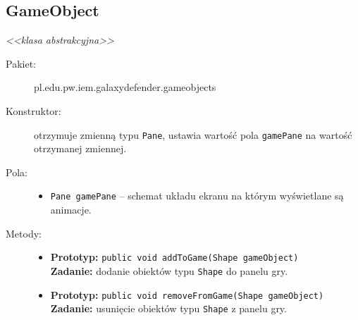 \documentclass[a4paper]{article}
\newcommand{\prog}{\texttt}
\begin{document}
\subsection{GameObject}
\textit{<<klasa abstrakcyjna>>}
\begin{description}
    \item[Pakiet:] pl.edu.pw.iem.galaxydefender.gameobjects
    \item[Konstruktor:] otrzymuje zmienną typu \prog{Pane}, ustawia wartość pola \prog{gamePane} na wartość otrzymanej zmiennej.
    \item[Pola:] \hfill
    \begin{itemize}
        \item \prog{Pane gamePane} -- schemat układu ekranu na którym wyświetlane są animacje.
    \end{itemize} 
    \item[Metody:] \hfill
    \begin{itemize}
        \item \textbf{Prototyp:} \prog{public void addToGame(Shape gameObject)}\\\textbf{Zadanie:} dodanie obiektów typu \prog{Shape} do panelu gry.
        \item \textbf{Prototyp:} \prog{public void removeFromGame(Shape gameObject)}\\\textbf{Zadanie:} usunięcie obiektów typu \prog{Shape} z panelu gry.
    \end{itemize}
\end{description}
\end{document}
